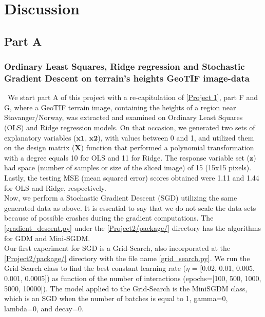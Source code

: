 \section{Discussion}
\label{chap:Discussion}

\subsection{Part A}
\label{chap:PartA}

\subsubsection{Ordinary Least Squares, Ridge regression and Stochastic Gradient Descent on terrain's heights GeoTIF image-data}
\label{chap:Ordinary Least Squares, Ridge regression and Stochastic Gradient Descent on terrain's heights GeoTIF image-data}

\qquad \, We start part A of this project with a re-capitulation of \href{https://github.com/fabiorodp/UiO-FYS-STK4155/blob/master/Project1}{[Project 1]}, part F and G, where a GeoTIF terrain image, containing the heights of a region near Stavanger/Norway, was extracted and examined on Ordinary Least Squares (OLS) and Ridge regression models. On that occasion, we generated two sets of explanatory variables ($\boldsymbol{x1}$, $\boldsymbol{x2}$), with values between 0 and 1, and utilized them on the design matrix ($\boldsymbol{X}$) function that performed a polynomial transformation with a degree equals 10 for OLS and 11 for Ridge. The response variable set ($\boldsymbol{z}$) had space (number of samples or size of the sliced image) of 15 (15x15 pixels). Lastly, the testing MSE (mean squared error) scores obtained were 1.11 and 1.44 for OLS and Ridge, respectively.\\

Now, we perform a Stochastic Gradient Descent (SGD) utilizing the same generated data as above. It is essential to say that we do not scale the data-sets because of possible crashes during the gradient computations. The \href{https://github.com/fabiorodp/UiO-FYS-STK4155/blob/master/Project2/package/gradient_descent.py}{[gradient\_descent.py]} under the \href{https://github.com/fabiorodp/UiO-FYS-STK4155/tree/master/Project2/package}{[Project2/package/]} directory has the algorithms for GDM and Mini-SGDM.\\

Our first experiment for SGD is a Grid-Search, also incorporated at the \href{https://github.com/fabiorodp/UiO-FYS-STK4155/tree/master/Project2/package}{[Project2/package/]} directory with the file name \href{https://github.com/fabiorodp/UiO-FYS-STK4155/blob/master/Project2/package/grid_search.py}{[grid\_search.py]}. We run the Grid-Search class to find the best constant learning rate ($\eta$ = [0.02, 0.01, 0.005, 0.001, 0.0005]) as function of the number of interactions (epochs=[100, 500, 1000, 5000, 10000]). The model applied to the Grid-Search is the MiniSGDM class, which is an SGD when the number of batches is equal to 1, gamma=0, lambda=0, and decay=0.\\

